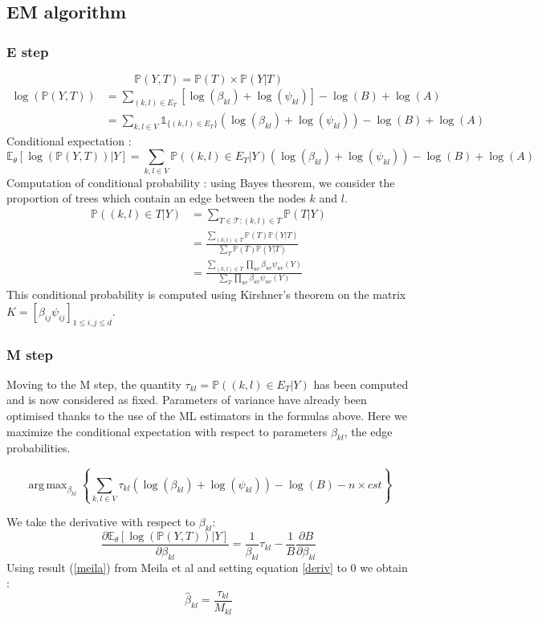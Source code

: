 \documentclass[a4paper,11pt]{article}
\DeclareMathOperator*{\argmax}{arg\,max}
\begin{document}
  \subsection{EM algorithm}
  \subsubsection{E step}
  \[ \mathds{P}(Y,T) = \mathds{P}(T)\times\mathds{P}(Y|T)\]
\begin{align*}
 \log(\mathds{P}(Y,T)) &= \sum_{(k,l)\in E_T} \left[ \log(\beta_{kl}) + \log(\psi_{kl})  \right] -\log(B)+\log(A) \\
 &= \sum_{k,l\in V} \mathds{1}_{\{(k,l) \in E_T\}} (\log(\beta_{kl}) + \log(\psi_{kl}) ) -\log(B) +\log(A)
 \end{align*}
  Conditional expectation :
\[ \mathds{E}_\theta[\log(\mathds{P}(Y,T))|Y] =\sum_{k,l\in V} \mathds{P}((k,l) \in E_T|Y) (\log(\beta_{kl}) + \log(\psi_{kl}) ) -\log(B) +\log(A)\]
  Computation of conditional probability : using Bayes theorem, we consider the proportion of trees which contain an edge between the nodes $k$ and $l$.
 \begin{align*}
  \mathds{P}((k,l)\in T | Y)&=\sum_{T\in \mathcal{T} : (k,l)\in T}\mathds{P}( T | Y) \\
  &= \frac{\sum_{(k,l)\in T} \mathds{P}(T)\mathds{P}(Y|T)}{\sum_{T} \mathds{P}(T)\mathds{P}(Y|T)}\\
 &=\frac{\sum_{(k,l)\in T} \prod_{uv} \beta_{uv}  \psi_{uv}(Y)}{\sum_{T} \prod_{uv} \beta_{uv} \psi_{uv}(Y)}
 \end{align*}
 This conditional probability is computed using Kirshner's theorem on the matrix $K = [\beta_{ij}\psi_{ij}]_{1\leq i, j\leq d}$.
  \subsubsection{M step}
    Moving to the M step, the quantity $\tau_{kl} =  \mathds{P}((k,l) \in E_T|Y)$ has been computed and is now considered as fixed.
    Parameters of variance have already been optimised thanks to the use of the ML estimators in the formulas above. Here we maximize the 
    conditional expectation with respect to parameters $\beta_{kl}$, the edge probabilities.


 \[\argmax_{\beta_{kl}} \left\{\sum_{k,l\in V} \tau_{kl}(\log(\beta_{kl}) + \log(\psi_{kl}) ) -\log(B) - n\times cst\right\}\]

 We take the derivative with respect to $\beta_{kl}$:
\begin{equation}
 \label{deriv}
 \frac{\partial\mathds{E}_\theta[\log(\mathds{P}(Y,T))|Y]}{\partial\beta_{kl}} =\frac{1 }{\beta_{kl}} \tau_{kl} - \frac{1}{B}
\frac{\partial B}{\partial\beta_{kl}}
\end{equation}
Using result (\ref{meila}) from Meila et al and setting equation \ref{deriv} to 0 we obtain :
\[\boxed{\hat{\beta}_{kl} = \frac{\tau_{kl}}{M_{kl}}}\]
 


\end{document}
